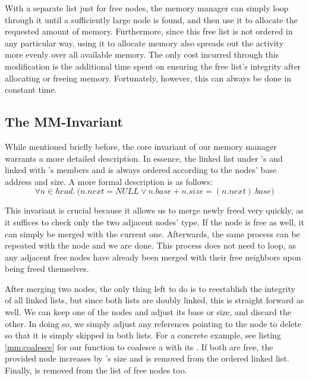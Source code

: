 With a separate list just for free nodes, the memory manager can simply loop through it until a sufficiently large node is found, and then use it to allocate the requested amount of memory. Furthermore, since this free list is not ordered in any particular way, using it to allocate memory also spreads out the activity more evenly over all available memory. The only cost incurred through this modification is the additional time spent on ensuring the free list's integrity after allocating or freeing memory. Fortunately, however, this can always be done in constant time.

\subsection{The MM-Invariant}
While mentioned briefly before, the core invariant of our memory manager warrants a more detailed description. In essence, the linked list under 's  and linked with 's members  and  is always ordered according to the nodes' base address and size. A more formal description is as follows:
\[
\forall n \in head.\ \big( n.next = NULL \lor
n.base + n.size = (n.next).base \big)
\]

This invariant is crucial because it allows us to merge newly freed  very quickly, as it suffices to check only the two adjacent nodes' type. If the node  is free as well, it can simply be merged with the current one. Afterwards, the same process can be repeated with the node  and we are done. This process does not need to loop, as any adjacent free nodes have already been merged with their free neighbors upon being freed themselves.

After merging two nodes, the only thing left to do is to reestablish the integrity of all linked lists, but since both lists are doubly linked, this is straight forward as well. We can keep one of the nodes and adjust its base or size, and discard the other. In doing so, we simply adjust any references pointing to the node to delete so that it is simply skipped in both lists. For a concrete example, see listing \ref{mm:coalesce} for our function to coalesce a  with its . If both are free, the provided node increases by 's size and  is removed from the ordered linked list. Finally,  is removed from the list of free nodes too.

